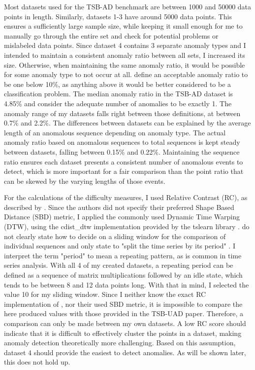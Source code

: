 \documentclass[12pt,oneside]{article}
\begin{document}
Most datasets used for the TSB-AD benchmark are between 1000 and 50000 data points in length. Similarly, datasets 1-3 have around 5000 data points. This ensures a sufficiently large sample size, while keeping it small enough for me to manually go through the entire set and check for potential problems or mislabeled data points. Since dataset 4 contains 3 separate anomaly types and I intended to maintain a consistent anomaly ratio between all sets, I increased its size. Otherwise, when maintaining the same anomaly ratio, it would be possible for some anomaly type to not occur at all. \cite[pp.~8]{SchmidlEtAl2022Anomaly} define an acceptable anomaly ratio to be one below 10\%, as anything above it would be better considered to be a classification problem. The median anomaly ratio in the TSB-AD dataset is 4.85\% and \cite[p.~4]{wu2021current} consider the adequate number of anomalies to be exactly 1. The anomaly range of my datasets falls right between those definitions, at between 0.7\% and 2.2\%. The differences between datasets can be explained by the average length of an anomalous sequence depending on anomaly type. The actual anomaly ratio based on anomalous sequences to total sequences is kept steady between datasets, falling between 0.15\% and 0.22\%. Maintaining the sequence ratio ensures each dataset presents a consistent number of anomalous events to detect, which is more important for a fair comparison than the point ratio that can be skewed by the varying lengths of those events. \par
For the calculations of the difficulty measures, I used Relative Contrast (RC), as described by \cite[pp.~1704]{paparrizos2022tsb}. Since the authors did not specify their preferred Shape Based Distance (SBD) metric, I applied the commonly used Dynamic Time Warping (DTW), using the cdist\_dtw implementation provided by the tslearn library \parencites{DTW}. \cite[pp.~1704]{paparrizos2022tsb} do not clearly state how to decide on a sliding window for the comparison of individual sequences and only state to "split the time series by its period" \parencite[p.~1704]{paparrizos2022tsb}. I interpret the term "period" to mean a repeating pattern, as is common in time series analysis. With all 4 of my created datasets, a repeating period can be defined as a sequence of matrix multiplications followed by an idle state, which tends to be between 8 and 12 data points long. With that in mind, I selected the value 10 for my sliding window. Since I neither know the exact RC implementation of \cite{paparrizos2022tsb}, nor their used SBD metric, it is impossible to compare the here produced values with those provided in the TSB-UAD paper. Therefore, a comparison can only be made between my own datasets. A low RC score should indicate that it is difficult to effectively cluster the points in a dataset, making anomaly detection theoretically more challenging. Based on this assumption, dataset 4 should provide the easiest to detect anomalies. As will be shown later, this does not hold up.
\end{document}
